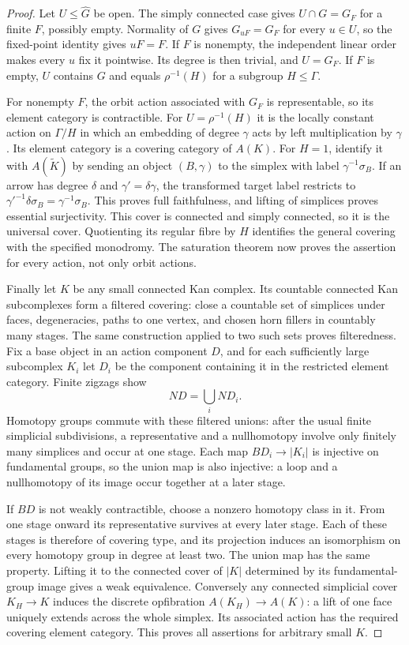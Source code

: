 \begin{proof}
Let $U\leq\widehat G$ be open. The simply connected case
gives $U\cap G=G_F$ for a finite $F$, possibly empty.
Normality of $G$ gives $G_{uF}=G_F$ for every $u\in U$,
so the fixed-point identity gives $uF=F$. If $F$ is nonempty,
the independent linear order makes every $u$ fix it
pointwise. Its degree is then trivial, and $U=G_F$.
If $F$ is empty, $U$ contains $G$ and equals
$\rho^{-1}(H)$ for a subgroup $H\leq\Gamma$.

For nonempty $F$, the orbit action associated with $G_F$
is representable, so its element category is contractible.
For $U=\rho^{-1}(H)$ it is the locally constant action on
$\Gamma/H$ in which an embedding of degree $\gamma$
acts by left multiplication by $\gamma$. Its element
category is a covering category of $A(K)$.
For $H=1$, identify it with $A(\widetilde K)$ by sending
an object $(B,\gamma)$ to the simplex with label
$\gamma^{-1}\sigma_B$. If an arrow has degree $\delta$
and $\gamma'=\delta\gamma$, the transformed target label
restricts to
$\gamma'^{-1}\delta\sigma_B=\gamma^{-1}\sigma_B$.
This proves full faithfulness, and lifting of simplices
proves essential surjectivity. This cover is connected and
simply connected, so it is the universal cover. Quotienting
its regular fibre by $H$ identifies the general covering
with the specified monodromy. The saturation theorem now
proves the assertion for every action, not only orbit actions.

Finally let $K$ be any small connected Kan complex. Its
countable connected Kan subcomplexes form a filtered covering:
close a countable set of simplices under faces, degeneracies,
paths to one vertex, and chosen horn fillers in countably
many stages. The same construction applied to two such sets
proves filteredness. Fix a base object in an action component
$D$, and for each sufficiently large subcomplex $K_i$ let
$D_i$ be the component containing it in the restricted
element category. Finite zigzags show
\[
 ND=\bigcup_i ND_i.
\]
Homotopy groups commute with these filtered unions: after
the usual finite simplicial subdivisions, a representative
and a nullhomotopy involve only finitely many simplices and
occur at one stage. Each map $BD_i\to|K_i|$ is injective
on fundamental groups, so the union map is also injective:
a loop and a nullhomotopy of its image occur together at a
later stage.

If $BD$ is not weakly contractible, choose a nonzero homotopy
class in it. From one stage onward its representative
survives at every later stage. Each of these stages is
therefore of covering type, and its projection induces an
isomorphism on every homotopy group in degree at least two.
The union map has the same property. Lifting it to the
connected cover of $|K|$ determined by its fundamental-group
image gives a weak equivalence. Conversely any connected
simplicial cover $K_H\to K$ induces the discrete
opfibration $A(K_H)\to A(K)$: a lift of one face uniquely
extends across the whole simplex. Its associated action has
the required covering element category. This proves all
assertions for arbitrary small $K$.
\end{proof}

